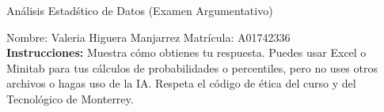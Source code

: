 \documentclass[8pt]{report}
\begin{document}
\newpage



\begin{center}
{An\'alisis Estad\'stico de Datos (Examen Argumentativo)}
\end{center}

Nombre: \underline{\hspace*{.2in}}
Valeria Higuera Manjarrez
\underline{\hspace*{.2in}} \quad Matr\'icula:\underline{\hspace*{.2in}}
A01742336
\underline{\hspace*{.2in}} \\

{\bf Instrucciones:} Muestra c\'omo obtienes tu respuesta. Puedes usar Excel 
o Minitab para tus cálculos de probabilidades o 
percentiles, pero no uses otros archivos o hagas uso de la IA. Respeta el 
c\'odigo de \'etica del curso y del Tecnol\'ogico 
de Monterrey.
\end{document}
